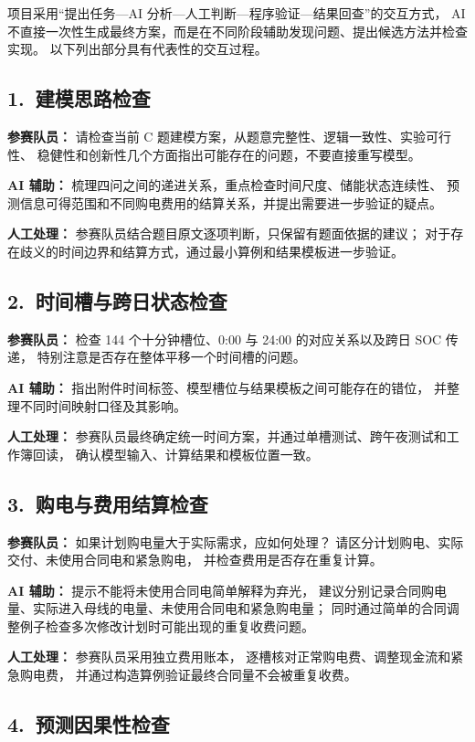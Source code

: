 \documentclass[zihao=-4,a4paper]{ctexart}
\begin{document}
项目采用“提出任务—AI 分析—人工判断—程序验证—结果回查”的交互方式，
AI 不直接一次性生成最终方案，而是在不同阶段辅助发现问题、提出候选方法并检查实现。
以下列出部分具有代表性的交互过程。

\subsection*{1.\ 建模思路检查}

\textbf{参赛队员：}
请检查当前 C 题建模方案，从题意完整性、逻辑一致性、实验可行性、
稳健性和创新性几个方面指出可能存在的问题，不要直接重写模型。

\textbf{AI 辅助：}
梳理四问之间的递进关系，重点检查时间尺度、储能状态连续性、
预测信息可得范围和不同购电费用的结算关系，并提出需要进一步验证的疑点。

\textbf{人工处理：}
参赛队员结合题目原文逐项判断，只保留有题面依据的建议；
对于存在歧义的时间边界和结算方式，通过最小算例和结果模板进一步验证。

\subsection*{2.\ 时间槽与跨日状态检查}

\textbf{参赛队员：}
检查 144 个十分钟槽位、0:00 与 24:00 的对应关系以及跨日 SOC 传递，
特别注意是否存在整体平移一个时间槽的问题。

\textbf{AI 辅助：}
指出附件时间标签、模型槽位与结果模板之间可能存在的错位，
并整理不同时间映射口径及其影响。

\textbf{人工处理：}
参赛队员最终确定统一时间方案，并通过单槽测试、跨午夜测试和工作簿回读，
确认模型输入、计算结果和模板位置一致。

\subsection*{3.\ 购电与费用结算检查}

\textbf{参赛队员：}
如果计划购电量大于实际需求，应如何处理？
请区分计划购电、实际交付、未使用合同电和紧急购电，
并检查费用是否存在重复计算。

\textbf{AI 辅助：}
提示不能将未使用合同电简单解释为弃光，
建议分别记录合同购电量、实际进入母线的电量、未使用合同电和紧急购电量；
同时通过简单的合同调整例子检查多次修改计划时可能出现的重复收费问题。

\textbf{人工处理：}
参赛队员采用独立费用账本，
逐槽核对正常购电费、调整现金流和紧急购电费，
并通过构造算例验证最终合同量不会被重复收费。

\subsection*{4.\ 预测因果性检查}
\end{document}
